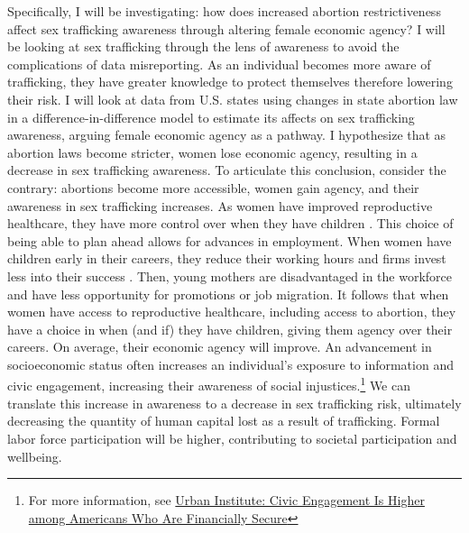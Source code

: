 \documentclass[12pt]{article}
\begin{document}
\indent Specifically, I will be investigating: how does increased abortion restrictiveness affect sex trafficking awareness through altering female economic agency? I will be looking at sex trafficking through the lens of awareness to avoid the complications of data misreporting. As an individual becomes more aware of trafficking, they have greater knowledge to protect themselves therefore lowering their risk. I will look at data from U.S. states using changes in state abortion law in a difference-in-difference model to estimate its affects on sex trafficking awareness, arguing female economic agency as a pathway. I hypothesize that as abortion laws become stricter, women lose economic agency, resulting in a decrease in sex trafficking awareness. To articulate this conclusion, consider the contrary: abortions become more accessible, women gain agency, and their awareness in sex trafficking increases.  As women have improved reproductive healthcare, they have more control over when they have children \citep{baileyandlindo}. This choice of being able to plan ahead allows for advances in employment. When women have children early in their careers, they reduce their working hours and firms invest less into their success \citep{BlauandKhan}. Then, young mothers are disadvantaged in the workforce and have less opportunity for promotions or job migration. It follows that when women have access to reproductive healthcare, including access to abortion, they have a choice in when (and if) they have children, giving them agency over their careers. On average, their economic agency will improve. An advancement in socioeconomic status often increases an individual’s exposure to information and civic engagement, increasing their awareness of social injustices.\footnote{For more information, see \href{https://www.urban.org/urban-wire/civic-engagement-higher-among-americans-who-are-financially-secure}{Urban Institute: Civic Engagement Is Higher among Americans Who Are Financially Secure}}  We can translate this increase in awareness to a decrease in sex trafficking risk, ultimately decreasing the quantity of human capital lost as a result of trafficking. Formal labor force participation will be higher, contributing to societal participation and wellbeing. 
\end{document}
